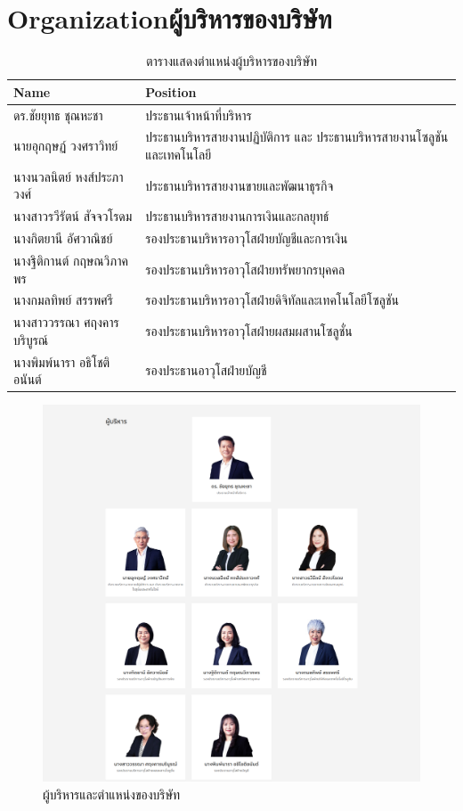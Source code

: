 \section{\ifenglish Organization\else ผู้บริหารของบริษัท\fi}
\begin{table}[ht]
    \centering
    \begin{tabular}{|p{5cm}||p{7cm}|}
        \hline
        \centering \textbf{Name} & \centering \textbf{Position} \tabularnewline
        \hline\hline
        \centering ดร.ชัยยุทธ ชุณหะชา & \centering ประธานเจ้าหน้าที่บริหาร \tabularnewline
        \centering นายอุกฤษฏ์ วงศราวิทย์ & \centering ประธานบริหารสายงานปฏิบัติการ และ ประธานบริหารสายงานโซลูชันและเทคโนโลยี \tabularnewline
        \centering นางนวลนิตย์ หงส์ประภาวงศ์ & \centering ประธานบริหารสายงานขายและพัฒนาธุรกิจ \tabularnewline
        \centering นางสาวรวีรัตน์ สัจจวโรดม & \centering ประธานบริหารสายงานการเงินและกลยุทธ์ \tabularnewline
        \centering นางกิตยานี อัศวาณิชย์ & \centering รองประธานบริหารอาวุโสฝ่ายบัญชีและการเงิน \tabularnewline
        \centering นางฐิติกานต์ กฤษณวิภาคพร & \centering รองประธานบริหารอาวุโสฝ่ายทรัพยากรบุคคล \tabularnewline
        \centering นางกมลทิพย์ สรรพศรี & \centering รองประธานบริหารอาวุโสฝ่ายดิจิทัลและเทคโนโลยีโซลูชัน \tabularnewline
        \centering นางสาววรรณา ศฤงคารบริบูรณ์ & \centering รองประธานบริหารอาวุโสฝ่ายผสมผสานโซลูชั่น \tabularnewline
        \centering นางพิมพ์นารา อธิโชติอนันต์ & \centering รองประธานอาวุโสฝ่ายบัญชี \tabularnewline
        \hline
    \end{tabular}
    \caption{ตารางแสดงตำแหน่งผู้บริหารของบริษัท}
\end{table}
\begin{figure}[ht]
    \begin{center}
        \includegraphics[width=1\linewidth]{./images/g-able-executives.png}
    \end{center}
    \caption[ผู้บริหารและตำแหน่งของบริษัท]{ผู้บริหารและตำแหน่งของบริษัท}
\end{figure}

